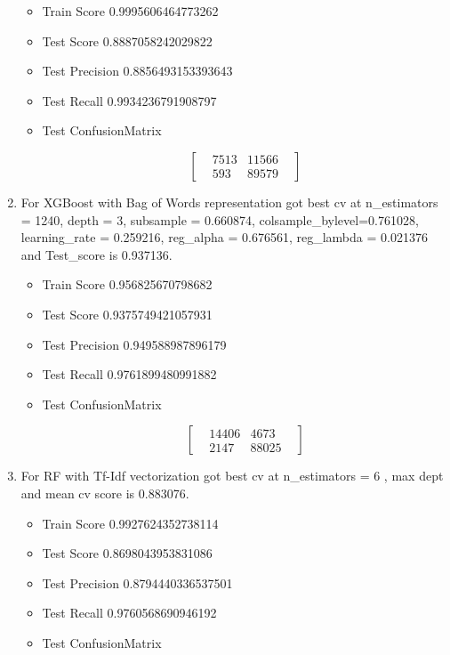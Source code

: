 \documentclass[11pt]{article}
\providecommand{\tightlist}{%
      \setlength{\itemsep}{0pt}\setlength{\parskip}{0pt}}
\begin{document}
\begin{enumerate}
  \begin{itemize}
  \tightlist
  \item
    Train Score 0.9995606464773262
  \item
    Test Score 0.8887058242029822
  \item
    Test Precision 0.8856493153393643
  \item
    Test Recall 0.9934236791908797
  \item
    Test ConfusionMatrix

    \begin{equation}
    \begin{bmatrix}
    & 7513 & 11566 &  \\
    & 593 & 89579 & 
    \end{bmatrix}
    \end{equation}
  \end{itemize}
\item
  For XGBoost with Bag of Words representation got best cv at
  n\_estimators = 1240, depth = 3, subsample = 0.660874,
  colsample\_bylevel=0.761028, learning\_rate = 0.259216, reg\_alpha =
  0.676561, reg\_lambda = 0.021376 and Test\_score is 0.937136.

  \begin{itemize}
  \tightlist
  \item
    Train Score 0.956825670798682
  \item
    Test Score 0.9375749421057931
  \item
    Test Precision 0.949588987896179
  \item
    Test Recall 0.9761899480991882
  \item
    Test ConfusionMatrix

    \begin{equation}
    \begin{bmatrix}
    & 14406 & 4673 &  \\
    & 2147 & 88025 & 
    \end{bmatrix}
    \end{equation}
  \end{itemize}
\item
  For RF with Tf-Idf vectorization got best cv at n\_estimators = 6 ,
  max dept and mean cv score is 0.883076.

  \begin{itemize}
  \tightlist
  \item
    Train Score 0.9927624352738114
  \item
    Test Score 0.8698043953831086
  \item
    Test Precision 0.8794440336537501
  \item
    Test Recall 0.9760568690946192
  \item
    Test ConfusionMatrix


\end{itemize}
\end{enumerate}
\end{document}
